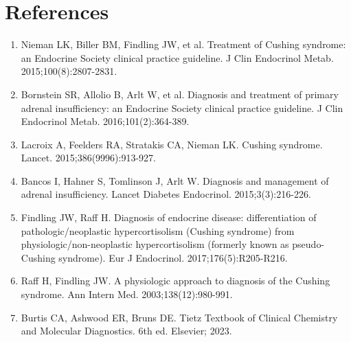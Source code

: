 \section*{References}
\begin{enumerate}
  \item Nieman LK, Biller BM, Findling JW, et al. Treatment of Cushing syndrome: an Endocrine Society clinical practice guideline. J Clin Endocrinol Metab. 2015;100(8):2807-2831.
  \item Bornstein SR, Allolio B, Arlt W, et al. Diagnosis and treatment of primary adrenal insufficiency: an Endocrine Society clinical practice guideline. J Clin Endocrinol Metab. 2016;101(2):364-389.
  \item Lacroix A, Feelders RA, Stratakis CA, Nieman LK. Cushing syndrome. Lancet. 2015;386(9996):913-927.
  \item Bancos I, Hahner S, Tomlinson J, Arlt W. Diagnosis and management of adrenal insufficiency. Lancet Diabetes Endocrinol. 2015;3(3):216-226.
  \item Findling JW, Raff H. Diagnosis of endocrine disease: differentiation of pathologic/neoplastic hypercortisolism (Cushing syndrome) from physiologic/non-neoplastic hypercortisolism (formerly known as pseudo-Cushing syndrome). Eur J Endocrinol. 2017;176(5):R205-R216.
  \item Raff H, Findling JW. A physiologic approach to diagnosis of the Cushing syndrome. Ann Intern Med. 2003;138(12):980-991.
  \item Burtis CA, Ashwood ER, Bruns DE. Tietz Textbook of Clinical Chemistry and Molecular Diagnostics. 6th ed. Elsevier; 2023.
\end{enumerate}

\clearpage
